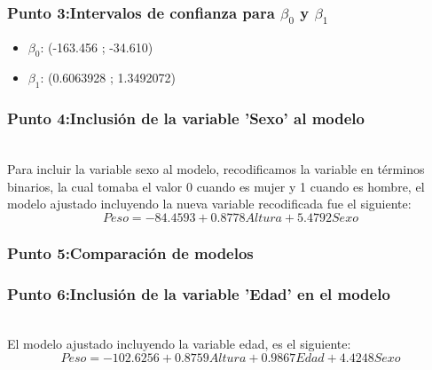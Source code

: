 \documentclass[12pt]{beamer}
\begin{document}
\begin{frame}
\frametitle{Punto 3:Intervalos de confianza para $\beta_{0}$ y $\beta_{1}$}
\begin{itemize}
\item $\beta_{0}$: (-163.456 ; -34.610)
\item $\beta_{1}$: (0.6063928 ; 1.3492072)
\end{itemize}

\end{frame}
\begin{frame}
\frametitle{Punto 4:Inclusión de la variable 'Sexo' al modelo}
~\\ Para incluir la variable sexo al modelo, recodificamos la variable en términos binarios, la cual tomaba el valor 0 cuando es mujer y 1 cuando es hombre, el modelo ajustado incluyendo la nueva variable recodificada fue el siguiente:
~\\ $$Peso=-84.4593+0.8778 Altura +  5.4792 Sexo $$
\end{frame}
\begin{frame}
\frametitle{Punto 5:Comparación de modelos}

\end{frame}

\begin{frame}
\frametitle{Punto 6:Inclusión de la variable 'Edad' en el modelo}
~\\ El modelo ajustado incluyendo la variable edad, es el siguiente:
~\\ $$Peso=-102.6256+0.8759 Altura +0.9867 Edad +4.4248 Sexo $$
\end{frame}
\end{document}
